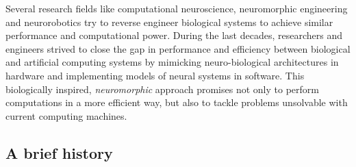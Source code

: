 Several research fields like computational neuroscience, neuromorphic engineering and neurorobotics try to reverse engineer biological systems to achieve similar performance and computational power.
During the last decades, researchers and engineers strived to close the gap in performance and efficiency between biological and artificial computing systems by mimicking neuro-biological architectures in hardware and implementing models of neural systems in software.
This biologically inspired, \textit{neuromorphic} approach promises not only to perform computations in a more efficient way, but also to tackle problems unsolvable with current computing machines.

\subsection{A brief history}%
\label{subsec:history_neural_nets}

